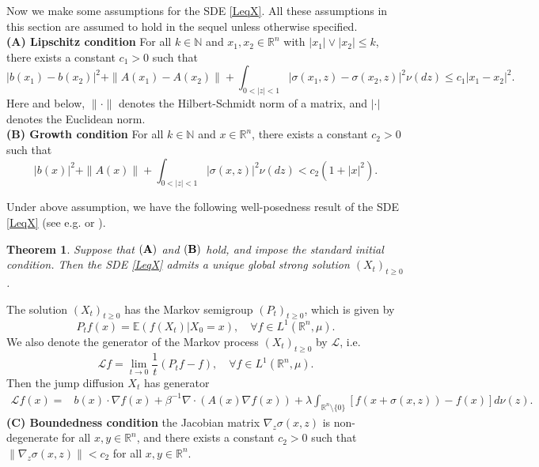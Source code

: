 \documentclass[10pt]{article}
\newtheorem{thm}{Theorem}[section]
\theoremstyle{definition}
\theoremstyle{remark}
\numberwithin{equation}{section}
\begin{document}
Now we make some assumptions for the SDE \eqref{LeqX}. All these assumptions in this section are assumed to hold in the sequel unless otherwise specified.
\\
{\bf (A) Lipschitz condition} For all $k \in \mathbb{N}$ and $ x_{1}, x_{2} \in  \mathbb{R}^n$ with $|x_1| \vee |x_2| \leq k$, there exists a constant  $c_1 >0$ such that
\begin{equation*}
     |b(x_1) - b(x_2)|^2+\|A(x_1)- A(x_2)\| + \int_{0 <|z| <1} |\sigma(x_1,z) - \sigma(x_2,z)|^2 \nu (dz) \leq c_1 |x_1-x_2|^{2}.
\end{equation*}
Here and below, $\|\cdot\|$ denotes the Hilbert-Schmidt norm of a matrix, and $|\cdot|$ denotes the Euclidean norm.\\
{\bf (B) Growth condition} For all $k \in \mathbb{N}$ and $ x\in  \mathbb{R}^n$, there exists a constant  $c_2 >0$ such that
\begin{equation*}
 |b(x)|^2 + \|A(x)\| + \int_{0 <|z| <1} |\sigma(x,z)|^2 \nu (dz) < c_2(1 + |x|^2).
\end{equation*}

Under above assumption, we have the following well-posedness result of the SDE \eqref{LeqX} (see e.g. \cite[Theorem 6.2.9]{A2004} or \cite[Theorem 3.3.1]{K19}).

\begin{thm}\label{ExD}
Suppose that $({\bf A})$ and $({\bf B})$ hold, and impose the standard initial condition. Then the SDE \eqref{LeqX} admits a unique global strong solution $(X_t)_{t\geq 0}$.
\end{thm}

The solution $(X_t)_{t\geq 0}$ has the Markov semigroup $(P_t)_{t\geq 0}$, which is given by
\begin{equation*}
    P_t f(x)=\mathbb{E}(f(X_t)|X_0 =x), \quad \forall f \in L^1(\mathbb{R}^n, \mu).
\end{equation*}
We also denote the generator of the Markov process $(X_t)_{t\geq 0}$ by $\mathcal{L}$, i.e.
\begin{equation*}
    \mathcal{L}f = \lim_{t \rightarrow 0} \frac{1}{t}(P_t f - f),\quad \forall f \in L^1(\mathbb{R}^n, \mu).
\end{equation*}
Then the jump diffusion $X_t$ has generator
\begin{align*}
    \mathcal{L}f(x) = & b(x) \cdot\nabla f(x) + \beta^{-1} \nabla\cdot (A(x)\nabla f(x)) + \lambda\int_{\mathbb{R}^n \setminus \{ 0 \} } \left[ f(x+ \sigma(x,z)) - f(x)\right] d\nu(z).
\end{align*}
{\bf (C) Boundedness condition} the Jacobian matrix $\nabla_z \sigma(x,z)$ is non-degenerate for all $x,y \in \mathbb{R}^n$, and there exists a constant $c_2>0$ such that $\|\nabla_z \sigma(x,z)\| < c_2$ for all $x,y \in \mathbb{R}^n$.
\end{document}
